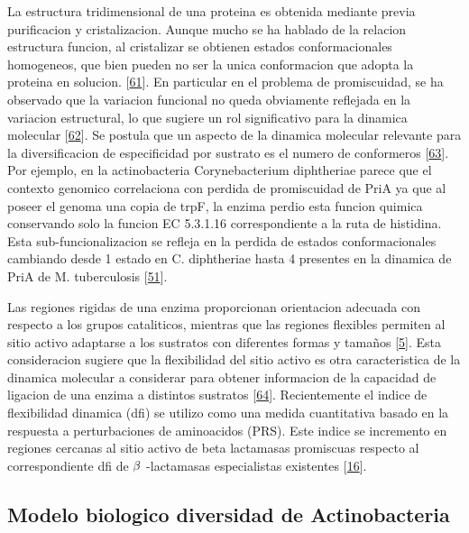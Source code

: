 \documentclass[12pt,twoside]{reedthesis}
\begin{document}
  La estructura tridimensional de una proteina es obtenida mediante previa
  purificacion y cristalizacion. Aunque mucho se ha hablado de la relacion
  estructura funcion, al cristalizar se obtienen estados conformacionales
  homogeneos, que bien pueden no ser la unica conformacion que adopta la
  proteina en solucion.
  {[}\protect\hyperlink{ref-jamesux5fconformationalux5f2003}{61}{]}. En
  particular en el problema de promiscuidad, se ha observado que la
  variacion funcional no queda obviamente reflejada en la variacion
  estructural, lo que sugiere un rol significativo para la dinamica
  molecular
  {[}\protect\hyperlink{ref-parisiux5fconformationalux5f2015}{62}{]}. Se
  postula que un aspecto de la dinamica molecular relevante para la
  diversificacion de especificidad por sustrato es el numero de
  conformeros
  {[}\protect\hyperlink{ref-javierux5fzeaux5fproteinux5f2013}{63}{]}. Por
  ejemplo, en la actinobacteria Corynebacterium diphtheriae parece que el
  contexto genomico correlaciona con perdida de promiscuidad de PriA ya
  que al poseer el genoma una copia de trpF, la enzima perdio esta funcion
  quimica conservando solo la funcion EC 5.3.1.16 correspondiente a la
  ruta de histidina. Esta sub-funcionalizacion se refleja en la perdida de
  estados conformacionales cambiando desde 1 estado en C. diphtheriae
  hasta 4 presentes en la dinamica de PriA de M. tuberculosis
  {[}\protect\hyperlink{ref-noda-garciaux5fevolutionux5f2013}{51}{]}.
  
  Las regiones rigidas de una enzima proporcionan orientacion adecuada con
  respecto a los grupos cataliticos, mientras que las regiones flexibles
  permiten al sitio activo adaptarse a los sustratos con diferentes formas
  y tamaños {[}\protect\hyperlink{ref-copleyux5fenzymesux5f2003}{5}{]}.
  Esta consideracion sugiere que la flexibilidad del sitio activo es otra
  caracteristica de la dinamica molecular a considerar para obtener
  informacion de la capacidad de ligacion de una enzima a distintos
  sustratos
  {[}\protect\hyperlink{ref-gatti-lafranconiux5fflexibilityux5f2013}{64}{]}.
  Recientemente el indice de flexibilidad dinamica (dfi) se utilizo como
  una medida cuantitativa basado en la respuesta a perturbaciones de
  aminoacidos (PRS). Este indice se incremento en regiones cercanas al
  sitio activo de beta lactamasas promiscuas respecto al correspondiente
  dfi de \(\noindent\beta\) -lactamasas especialistas existentes
  {[}\protect\hyperlink{ref-zouux5fevolutionux5f2015}{16}{]}.
  
  \subsection{Modelo biologico diversidad de
  Actinobacteria}\label{modelo-biologico-diversidad-de-actinobacteria}
  
\end{document}
